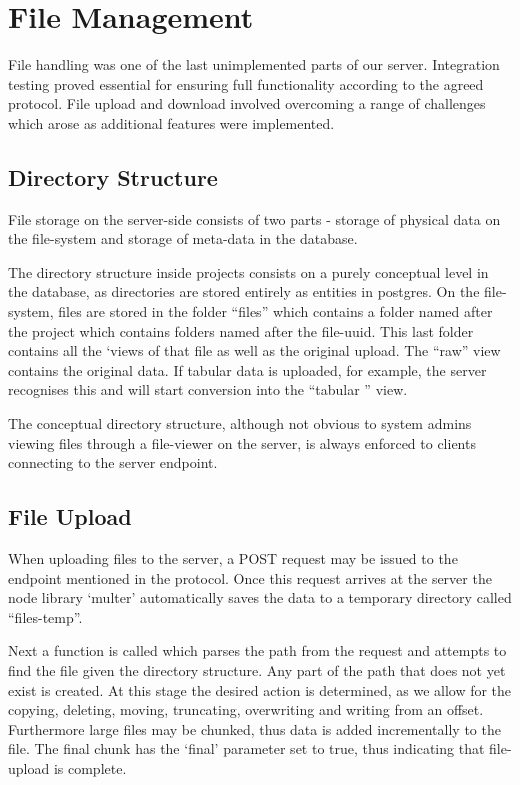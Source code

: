 \section{File Management}
File handling was one of the last unimplemented parts of our server. Integration testing proved essential for ensuring full functionality according to the agreed protocol. File upload and download involved overcoming a range of challenges which arose as additional features were implemented. 
\subsection{Directory Structure}
File storage on the server-side consists of two parts - storage of physical data on the file-system and storage of meta-data in the database. 

The directory structure inside projects consists on a purely conceptual level in the database, as directories are stored entirely as entities in postgres. On the file-system, files are stored in the folder ``files'' which contains a folder named after the project which contains folders named after the file-uuid. This last folder contains all the `views of that file as well as the original upload. The ``raw'' view contains the original data. If tabular data is uploaded, for example, the server recognises this and will start conversion into the ``tabular '' view.

The conceptual directory structure, although not obvious to system admins viewing files through a file-viewer on the server, is always enforced to clients connecting to the server endpoint. 

\subsection{File Upload}
When uploading files to the server, a POST request may be issued to the endpoint mentioned in the protocol. Once this request arrives at the server the node library `multer' automatically saves the data to a temporary directory called ``files-temp''. 

Next a function is called which parses the path from the request and attempts to find the file given the directory structure. Any part of the path that does not yet exist is created. At this stage the desired action is determined, as we allow for the copying, deleting, moving, truncating, overwriting and writing from an offset. Furthermore large files may be chunked, thus data is added incrementally to the file. The final chunk has the `final' parameter set to true, thus indicating that file-upload is complete.

